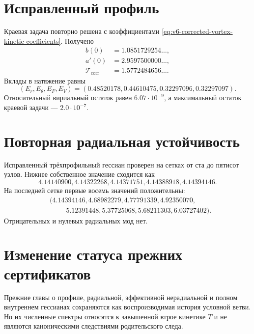 \section{Исправленный профиль}

Краевая задача повторно решена с коэффициентами
\eqref{eq:v6-corrected-vortex-kinetic-coefficients}. Получено
\begin{align}
 b(0)&=1.0851729254\ldots,\\
 a'(0)&=2.9597500000\ldots,\\
 \mathcal T_{\mathrm{corr}}&=1.5772484656\ldots.
\end{align}
Вклады в натяжение равны
\begin{equation}
 (E_{r},E_{\theta},E_F,E_V)
 =(0.48520178,0.44610475,0.32297096,0.32297097).
\end{equation}
Относительный вириальный остаток равен $6.07\cdot10^{-9}$, а максимальный
остаток краевой задачи --- $2.0\cdot10^{-7}$.

\section{Повторная радиальная устойчивость}

Исправленный трёхпрофильный гессиан проверен на сетках от ста до пятисот
узлов. Нижнее собственное значение сходится как
\begin{equation}
 4.14140900, 4.14322268, 4.14371751,
 4.14388918, 4.14394146.
\end{equation}
На последней сетке первые восемь значений положительны:
\begin{equation}
\begin{split}
 &(4.14394146,4.68982279,4.77791339,4.92350070,\\
 &\hspace{1cm}5.12391448,5.37725068,5.68211303,6.03727402).
\end{split}
\end{equation}
Отрицательных и нулевых радиальных мод нет.

\section{Изменение статуса прежних сертификатов}

Прежние главы о профиле, радиальной, эффективной нерадиальной и полном
внутреннем гессианах сохраняются как воспроизводимая история условной
ветви. Но их численные спектры относятся к завышенной втрое кинетике
$T$ и не являются каноническими следствиями родительского следа.

